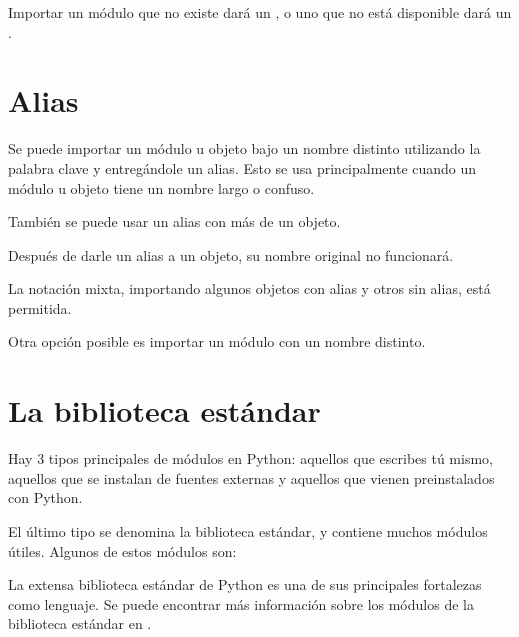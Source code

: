 Importar un módulo que no existe dará un , o uno que no está disponible dará un .


\section{Alias}

Se puede importar un módulo u objeto bajo un nombre distinto utilizando la palabra clave  y entregándole un alias.
Esto se usa principalmente cuando un módulo u objeto tiene un nombre largo o confuso.


También se puede usar un alias con más de un objeto.


Después de darle un alias a un objeto, su nombre original no funcionará.


La notación mixta, importando algunos objetos con alias y otros sin alias, está permitida.


Otra opción posible es importar un módulo con un nombre distinto.


\section{La biblioteca estándar}

Hay 3 tipos principales de módulos en Python: aquellos que escribes tú mismo, aquellos que se instalan de fuentes externas y aquellos que vienen preinstalados con Python.
\medskip

El último tipo se denomina la biblioteca estándar, y contiene muchos módulos útiles.
Algunos de estos módulos son:


La extensa biblioteca estándar de Python es una de sus principales fortalezas como lenguaje.
Se puede encontrar más información sobre los módulos de la biblioteca estándar en .
\medskip

